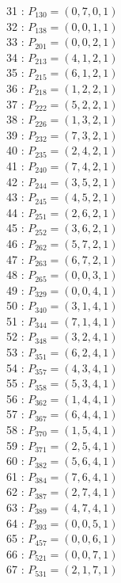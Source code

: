 \documentclass{article}
\begin{document}
{\begin{multicols}{3}
31 : $P_{130}=( 0, 7, 0, 1 )$\\
32 : $P_{138}=( 0, 0, 1, 1 )$\\
33 : $P_{201}=( 0, 0, 2, 1 )$\\
34 : $P_{213}=( 4, 1, 2, 1 )$\\
35 : $P_{215}=( 6, 1, 2, 1 )$\\
36 : $P_{218}=( 1, 2, 2, 1 )$\\
37 : $P_{222}=( 5, 2, 2, 1 )$\\
38 : $P_{226}=( 1, 3, 2, 1 )$\\
39 : $P_{232}=( 7, 3, 2, 1 )$\\
40 : $P_{235}=( 2, 4, 2, 1 )$\\
41 : $P_{240}=( 7, 4, 2, 1 )$\\
42 : $P_{244}=( 3, 5, 2, 1 )$\\
43 : $P_{245}=( 4, 5, 2, 1 )$\\
44 : $P_{251}=( 2, 6, 2, 1 )$\\
45 : $P_{252}=( 3, 6, 2, 1 )$\\
46 : $P_{262}=( 5, 7, 2, 1 )$\\
47 : $P_{263}=( 6, 7, 2, 1 )$\\
48 : $P_{265}=( 0, 0, 3, 1 )$\\
49 : $P_{329}=( 0, 0, 4, 1 )$\\
50 : $P_{340}=( 3, 1, 4, 1 )$\\
51 : $P_{344}=( 7, 1, 4, 1 )$\\
52 : $P_{348}=( 3, 2, 4, 1 )$\\
53 : $P_{351}=( 6, 2, 4, 1 )$\\
54 : $P_{357}=( 4, 3, 4, 1 )$\\
55 : $P_{358}=( 5, 3, 4, 1 )$\\
56 : $P_{362}=( 1, 4, 4, 1 )$\\
57 : $P_{367}=( 6, 4, 4, 1 )$\\
58 : $P_{370}=( 1, 5, 4, 1 )$\\
59 : $P_{371}=( 2, 5, 4, 1 )$\\
60 : $P_{382}=( 5, 6, 4, 1 )$\\
61 : $P_{384}=( 7, 6, 4, 1 )$\\
62 : $P_{387}=( 2, 7, 4, 1 )$\\
63 : $P_{389}=( 4, 7, 4, 1 )$\\
64 : $P_{393}=( 0, 0, 5, 1 )$\\
65 : $P_{457}=( 0, 0, 6, 1 )$\\
66 : $P_{521}=( 0, 0, 7, 1 )$\\
67 : $P_{531}=( 2, 1, 7, 1 )$\\

\end{multicols}}
\end{document}
